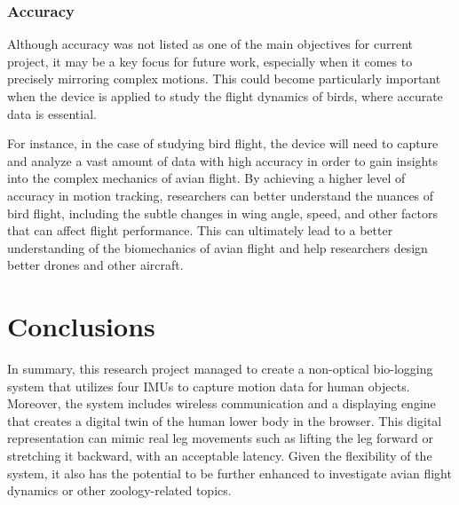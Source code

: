 \subsubsection{Accuracy}
Although accuracy was not listed as one of the main objectives for current project, it may be a key focus for future work, especially when it comes to precisely mirroring complex motions.
This could become particularly important when the device is applied to study the flight dynamics of birds, where accurate data is essential.

For instance, in the case of studying bird flight, the device will need to capture and analyze a vast amount of data with high accuracy in order to gain insights into the complex mechanics of avian flight.
By achieving a higher level of accuracy in motion tracking, researchers can better understand the nuances of bird flight, including the subtle changes in wing angle, speed, and other factors that can affect flight performance.
This can ultimately lead to a better understanding of the biomechanics of avian flight and help researchers design better drones and other aircraft.




\section{Conclusions}
\parindent

In summary, this research project managed to create a non-optical bio-logging system that utilizes four IMUs to capture motion data for human objects.
Moreover, the system includes wireless communication and a displaying engine that creates a digital twin of the human lower body in the browser.
This digital representation can mimic real leg movements such as lifting the leg forward or stretching it backward, with an acceptable latency.
Given the flexibility of the system, it also has the potential to be further enhanced to investigate avian flight dynamics or other zoology-related topics.

